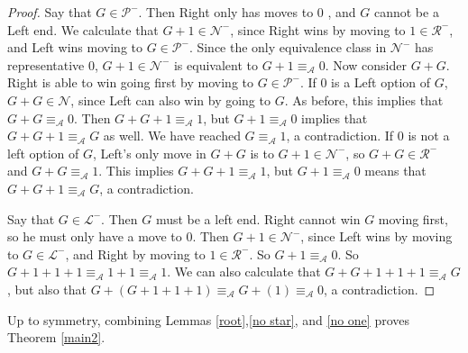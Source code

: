 \documentclass{amsart}
\theoremstyle{plain}
\theoremstyle{definition}
\theoremstyle{remark}
\numberwithin{equation}{section}
\numberwithin{thm}{section}
\begin{document}
\begin{proof}
Say that $G \in \mathcal{P}^-$. Then Right only has moves to $0$ , and $G$ cannot be a Left end.
We calculate that $G+1\in \mathcal{N}^-$, since Right wins by moving to $1 \in \mathcal{R}^-$, and Left wins moving to $G \in \mathcal{P}^-$.
Since the only equivalence class in $\mathcal{N}^-$ has representative $0$, $G+1 \in \mathcal{N}^-$ is equivalent to $G+1 \equiv_{\mathscr{A}} 0$. 
Now consider $G+G$. Right is able to win going first by moving to $G \in \mathcal{P}^-$.
If $0$ is a Left option of $G$, $G+G \in \mathcal{N}$, since Left can also win by going to $G$. As before, this implies that $G+G \equiv_{\mathscr{A}} 0$. Then $G+G+1 \equiv_{\mathscr{A}} 1$, but $G+1 \equiv_{\mathscr{A}} 0$ implies that $G+G+1 \equiv_{\mathscr{A}} G$ as well. We have reached $G \equiv_{\mathscr{A}} 1$, a contradiction.
If $0$ is not a left option of $G$, Left's only move in $G+G$ is to $G+1 \in \mathcal{N}^-$, so $G+G \in \mathcal{R}^-$ and $G + G\equiv_{\mathscr{A}} 1$. This implies $G+G+1 \equiv_{\mathscr{A}} 1$, but $G+1 \equiv_{\mathscr{A}} 0$ means that $G+G+1 \equiv_{\mathscr{A}} G$, a contradiction. 

Say that $G \in \mathcal{L}^-$. Then $G$ must be a left end. Right cannot win $G $ moving first, so he must only have a move to $0$. Then $G +1 \in \mathcal{N}^-$, since Left wins by moving to $G \in \mathcal{L}^-$, and Right by moving to $1 \in \mathcal{R}^-$. So $G+1 \equiv_{\mathscr{A}} 0$. So $G+1 + 1 +1\equiv_{\mathscr{A}} 1 +1 \equiv_{\mathscr{A}} 1$. We can also calculate that $G+G+1+1+1 \equiv_{\mathscr{A}} G$, but also that $G + (G+1+1+1) \equiv_{\mathscr{A}} G+(1) \equiv_{\mathscr{A}} 0$, a contradiction.
\end{proof}
Up to symmetry, combining Lemmas \ref{root},\ref{no star}, and \ref{no one} proves Theorem \ref{main2}. 


\printbibliography
\end{document}
